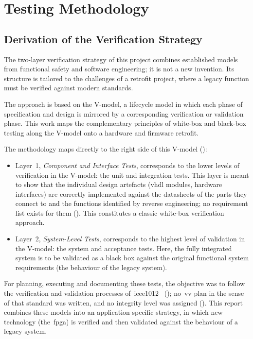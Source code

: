 \chapter{Testing Methodology}
\label{chap:testing}

\section{Derivation of the Verification Strategy}
\label{sec:derivation_of_strategy}

The two-layer verification strategy of this project combines established models from functional safety and software engineering; it is not a new invention. Its structure is tailored to the challenges of a retrofit project, where a legacy function must be verified against modern standards.

The approach is based on the V-model, a lifecycle model in which each phase of specification and design is mirrored by a corresponding verification or validation phase. This work maps the complementary principles of white-box and black-box testing along the V-model onto a hardware and firmware retrofit.

The methodology maps directly to the right side of this V-model ():
\begin{itemize}
	\item Layer~1, \emph{Component and Interface Tests}, corresponds to the lower levels of verification in the V-model: the unit and integration tests. This layer is meant to show that the individual design artefacts (\gls{vhdl} modules, hardware interfaces) are correctly implemented against the datasheets of the parts they connect to and the functions identified by reverse engineering; no requirement list exists for them (). This constitutes a classic white-box verification approach.
	\item Layer~2, \emph{System-Level Tests}, corresponds to the highest level of validation in the V-model: the system and acceptance tests. Here, the fully integrated system is to be validated as a black box against the original functional system requirements (the behaviour of the legacy system).
\end{itemize}

For planning, executing and documenting these tests, the objective was to follow the verification and validation processes of~\gls{ieee1012}~\cite{ieee1012_2024} (); no~\gls{vv} plan in the sense of that standard was written, and no integrity level was assigned (). This report combines these models into an application-specific strategy, in which new technology (the~\gls{fpga}) is verified and then validated against the behaviour of a legacy system.

